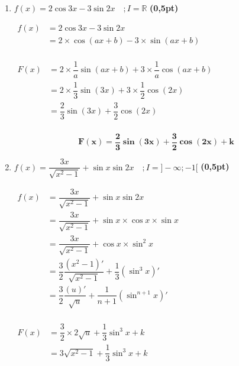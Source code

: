 \documentclass[12pt,a4paper]{article}
\begin{document}
\begin{enumerate}
\begin{enumerate}
\begin{resultbox}
    \[
    \mathbf{F(x) = -2\sqrt{3 + \cos x} +k }
    \]
\end{resultbox}               
        
        \item $f(x) = 2\cos 3x - 3\sin 2x \quad ; I = \mathbb{R}$ \textbf{(0,5pt)}

$
        \begin{aligned}
        f(x) &= 2\cos 3x - 3\sin 2x\\
             &= 2 \times \cos (ax+b) - 3 \times \sin (ax+b)\\
        \end{aligned}
        $

        $
        \begin{aligned}
        F(x) &= 2 \times \dfrac{1}{a} \sin (ax+b) + 3 \times \dfrac{1}{a} \cos (ax+b)\\
             &= 2 \times \dfrac{1}{3} \sin (3x) + 3 \times \dfrac{1}{2} \cos (2x)\\ 
             &= \dfrac{2}{3} \sin (3x) + \dfrac{3}{2} \cos (2x)\\ 
        \end{aligned}
        $        

\begin{resultbox}
    \[
    \mathbf{F(x) = \dfrac{2}{3} \sin (3x) + \dfrac{3}{2} \cos (2x) +k }
    \]
\end{resultbox}     
        
        \item $f(x) = \dfrac{3x}{\sqrt{x^2 - 1}} + \sin x \sin 2x \quad ; I = ]-\infty; -1[$ \textbf{(0,5pt)}

$
        \begin{aligned}
        f(x) &= \dfrac{3x}{\sqrt{x^2 - 1}} + \sin x \sin 2x\\
             &= \dfrac{3x}{\sqrt{x^2 - 1}} + \sin x \times \cos x \times \sin x\\
             &= \dfrac{3x}{\sqrt{x^2 - 1}} + \cos x \times \sin^{2} x\\
             &= \dfrac{3}{2}\dfrac{(x^2 - 1)'}{\sqrt{x^2 - 1}} +\dfrac{1}{3} (\sin^{3} x)'\\
             &= \dfrac{3}{2}\dfrac{(u)'}{\sqrt{u}} +\dfrac{1}{n+1} (\sin^{n+1} x)'\\
        \end{aligned}
        $

        $
        \begin{aligned}
        F(x) &= \dfrac{3}{2}\times 2\sqrt{u} +\dfrac{1}{3} \sin^{3} x + k\\
             &= 3\sqrt{x^2 - 1} +\dfrac{1}{3} \sin^{3} x +k\\ 
        \end{aligned}
        $        


\end{enumerate}
\end{enumerate}
\end{document}
